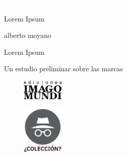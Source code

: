 \ifPDF
\PaginaEnBlanco
\PaginaEnBlanco
	\else
	\ifBNPDF
	\PaginaEnBlanco
	\PaginaEnBlanco
	\fi
\fi

\newpage
\thispagestyle{empty}
{\textcolor{white}{.}}

\vspace{30mm}

\begin{center}
	\LARGE{Lorem Ipsum}
\end{center}

\ifPDF
\PaginaEnBlanco
	\else
	\ifBNPDF
	\PaginaEnBlanco
	\fi
\fi

\newpage
\thispagestyle{empty}
\begin{center}%
{\sc\large{alberto moyano}}\\ %
\end{center}

\vspace{30mm}

\begin{center}
\LARGE{Lorem Ipsum}\\\vspace{10mm}

\Large{Un estudio preliminar sobre las marcas}
\end{center}

\vfill

\begin{figure}[b]
\centering
\includegraphics[width=20mm]{./media/logo-imago-ByW.png}
\end{figure}

\newpage
\thispagestyle{empty}
\begin{figure}[t]
\centering
\vspace{-10mm}
\includegraphics[width=20mm]{./media/desconocido.png}\\
\end{figure}

